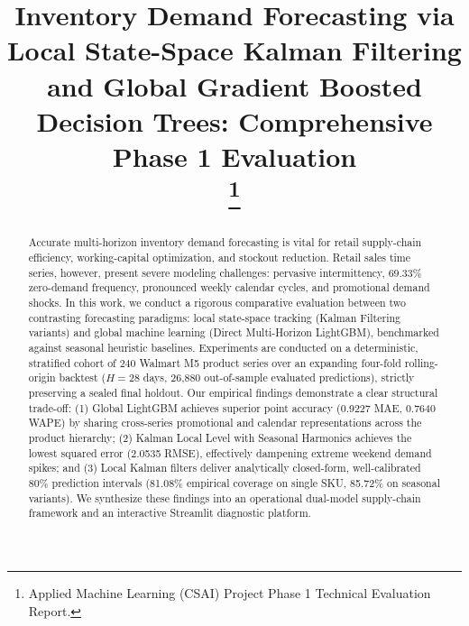 \documentclass[conference]{IEEEtran}
\begin{document}
\title{Inventory Demand Forecasting via Local State-Space Kalman Filtering and Global Gradient Boosted Decision Trees: Comprehensive Phase 1 Evaluation\\
\thanks{Applied Machine Learning (CSAI) Project Phase 1 Technical Evaluation Report.}
}

\author{
}

\maketitle

\begin{abstract}
Accurate multi-horizon inventory demand forecasting is vital for retail supply-chain efficiency, working-capital optimization, and stockout reduction. Retail sales time series, however, present severe modeling challenges: pervasive intermittency, 69.33\% zero-demand frequency, pronounced weekly calendar cycles, and promotional demand shocks. In this work, we conduct a rigorous comparative evaluation between two contrasting forecasting paradigms: local state-space tracking (Kalman Filtering variants) and global machine learning (Direct Multi-Horizon LightGBM), benchmarked against seasonal heuristic baselines. Experiments are conducted on a deterministic, stratified cohort of 240 Walmart M5 product series over an expanding four-fold rolling-origin backtest ($H=28$ days, 26,880 out-of-sample evaluated predictions), strictly preserving a sealed final holdout. Our empirical findings demonstrate a clear structural trade-off: (1) Global LightGBM achieves superior point accuracy (0.9227 MAE, 0.7640 WAPE) by sharing cross-series promotional and calendar representations across the product hierarchy; (2) Kalman Local Level with Seasonal Harmonics achieves the lowest squared error (2.0535 RMSE), effectively dampening extreme weekend demand spikes; and (3) Local Kalman filters deliver analytically closed-form, well-calibrated 80\% prediction intervals (81.08\% empirical coverage on single SKU, 85.72\% on seasonal variants). We synthesize these findings into an operational dual-model supply-chain framework and an interactive Streamlit diagnostic platform.
\end{abstract}
\end{document}
